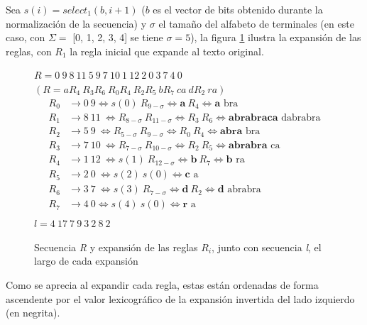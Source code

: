 Sea $s(i) = select_{1}(b, i + 1)$ ($b$ es el vector de bits obtenido durante la normalización de la secuencia) y $\sigma$ el tamaño del alfabeto de terminales (en este caso, con $\Sigma = $ [0, 1, 2, 3, 4] se tiene $\sigma = 5$), la figura \ref{fig:transformaciones} ilustra la expansión de las reglas, con $R_1$ la regla inicial que expande al texto original.
\begin{figure}[ht]
\centering

$R = 0\ 9\ 8\ 11\ 5\ 9\ 7\ 10\ 1\ 12\ 2\ 0\ 3\ 7\ 4\ 0$ \\
$(R = a R_4\ R_3 R_6\ R_0 R_4\ R_2 R_5\ b R_7\ c a\ d R_2\ r a)$
\[
\begin{array}{rl}
R_0 & \rightarrow 0\ 9 
\Longleftrightarrow s(0)\ R_{9 - \sigma} \Longleftrightarrow \textbf{a}\ R_{4} \Longleftrightarrow  \textbf{a} \text{ bra} \\
R_1 & \rightarrow 8\ 11\ 
\Longleftrightarrow R_{8 - \sigma}\ R_{11 - \sigma} \Longleftrightarrow R_{3}\ R_{6} \Longleftrightarrow \textbf{abrabraca} \text{ dabrabra} \\
R_2 & \rightarrow 5\ 9\ 
\Longleftrightarrow R_{5 - \sigma}\ R_{9 - \sigma} \Longleftrightarrow R_{0}\ R_{4} \Longleftrightarrow \textbf{abra} \text{ bra} \\
R_3 & \rightarrow 7\ 10\ 
\Longleftrightarrow R_{7 - \sigma}\ R_{10 - \sigma} \Longleftrightarrow R_{2}\ R_{5} \Longleftrightarrow \textbf{abrabra} \text{ ca} \\
R_4 & \rightarrow 1\ 12\ 
\Longleftrightarrow s(1)\ R_{12 - \sigma} \Longleftrightarrow \textbf{b}\ R_{7} \Longleftrightarrow \textbf{b} \text{ ra} \\
R_5 & \rightarrow 2\ 0\ 
\Longleftrightarrow s(2)\ s(0) \Longleftrightarrow \textbf{c} \text{ a} \\
R_6 & \rightarrow 3\ 7\ 
\Longleftrightarrow s(3)\ R_{7 - \sigma} \Longleftrightarrow \textbf{d}\ R_2 \Longleftrightarrow \textbf{d} \text{ abrabra} \\
R_7 & \rightarrow 4\ 0 
\Longleftrightarrow s(4)\ s(0) \Longleftrightarrow \textbf{r} \text{ a} \\
\end{array}
\]
$l = 4\ 17\ 7\ 9\ 3\ 2\ 8\ 2$
\caption{Secuencia \textit{R} y expansión de las reglas $R_i$, junto con secuencia \textit{l}, el largo de cada expansión}
\label{fig:transformaciones}
\end{figure}

Como se aprecia al expandir cada regla, estas están ordenadas de forma ascendente por el valor lexicográfico de la expansión invertida del lado izquierdo (en negrita).


